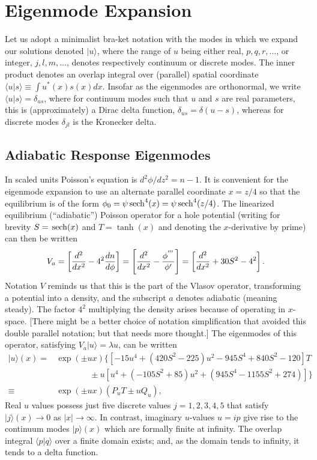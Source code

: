 \documentclass[12pt]{article}
\def\ket#1{|#1\rangle}
\def\bra#1{\langle#1}
\def\sech{{\,\rm sech}}
\begin{document}
\section{Eigenmode Expansion}
Let us adopt a minimalist bra-ket notation with the modes in
which we expand our solutions
denoted $\ket{u}$, where the range of $u$ being either real, $p,q,r,\dots$, or
integer, $j,l,m,\dots$, denotes respectively continuum or discrete modes. The
inner product denotes an overlap integral over (parallel) spatial
coordinate $\bra{u}\ket{s}\equiv \int u^*(x)s(x)dx$. Insofar as the
eigenmodes are orthonormal, we write $\bra{u}\ket{s}=\delta_{us}$,
where for continuum modes such that $u$ and $s$ are real parameters,
this is (approximately) a Dirac delta function,
$\delta_{us}=\delta(u-s)$, whereas for discrete modes $\delta_{jl}$ is
the Kronecker delta.

\subsection{Adiabatic Response Eigenmodes}
In scaled units Poisson's equation is $d^2\phi/dz^2=n-1$. It is
convenient for the eigenmode expansion to use an alternate parallel coordinate
$x=z/4$ so that the equilibrium is of the form
$\phi_0=\psi\sech^4(x)=\psi\sech^4(z/4)$.  The linearized equilibrium
(``adiabatic'') Poisson operator for a hole potential (writing for brevity
$S=\sech(x)$ and $T=\tanh(x)$ and denoting the $x$-derivative by
prime) can then be written
\begin{equation}
  \label{eq:1}
  V_a = \left[{d^2\over dx^2} - 4^2{dn\over d\phi}\right]
  = \left[{d^2\over dx^2} - {\phi^{'''}\over \phi'}\right]
  = \left[{d^2\over dx^2} +30S^2- 4^2\right].
\end{equation}
Notation $V$ reminds us that this is the part of the Vlasov operator,
transforming a potential into a density, and the subscript $a$ denotes
adiabatic (meaning steady). The factor $4^2$ multiplying the density arises
because of operating in $x$-space. [There might be a better choice of
notation simplification that avoided this double parallel notation;
but that needs more thought.]  The eigenmodes of this operator, satisfying
$V_a\ket{u}=\lambda u$, can be written
\begin{equation}
  \label{eq:2}
  \begin{split}
 \ket{u}(x)= &\exp(\pm ux)\{[-15u^4 + (420S^2 - 225)u^2 - 945S^4 +
 840S^2 - 120]T \\
 &\qquad\qquad\pm u[u^4 + (-105S^2 + 85)u^2 + (945S^4 - 1155S^2 +274)]\} \\
 \equiv&  \exp(\pm ux)(P_uT\pm uQ_u),
  \end{split}
\end{equation}
Real $u$ values possess just five discrete values $j=1,2,3,4,5$ that
satisfy $\ket{j}(x)\to0$ as $|x|\to\infty$. In contrast, imaginary
$u$-values $u=ip$ give rise to the continuum modes $\ket{p}(x)$ which
are formally finite at infinity. The overlap integral $\bra{p}\ket{q}$
over a finite domain exists; and, as the domain tends to infinity, it tends
to a delta function.
\end{document}
